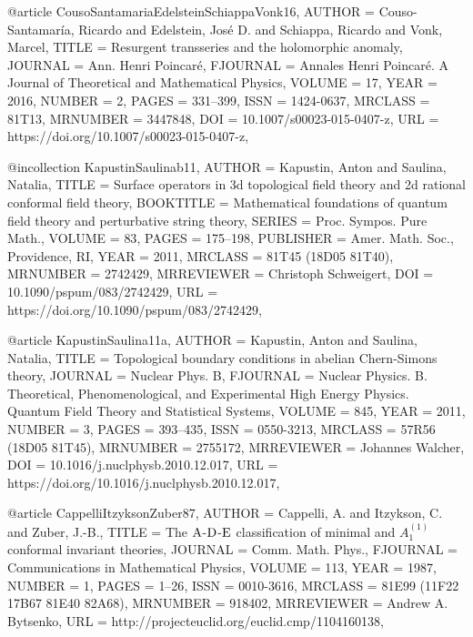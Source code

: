 @article {CousoSantamariaEdelsteinSchiappaVonk16,
    AUTHOR = {Couso-Santamar\'{i}a, Ricardo and Edelstein, Jos\'{e} D. and Schiappa,
              Ricardo and Vonk, Marcel},
     TITLE = {Resurgent transseries and the holomorphic anomaly},
   JOURNAL = {Ann. Henri Poincar\'{e}},
  FJOURNAL = {Annales Henri Poincar\'{e}. A Journal of Theoretical and
              Mathematical Physics},
    VOLUME = {17},
      YEAR = {2016},
    NUMBER = {2},
     PAGES = {331--399},
      ISSN = {1424-0637},
   MRCLASS = {81T13},
  MRNUMBER = {3447848},
       DOI = {10.1007/s00023-015-0407-z},
       URL = {https://doi.org/10.1007/s00023-015-0407-z},
}

@incollection {KapustinSaulinab11,
    AUTHOR = {Kapustin, Anton and Saulina, Natalia},
     TITLE = {Surface operators in 3d topological field theory and 2d
              rational conformal field theory},
 BOOKTITLE = {Mathematical foundations of quantum field theory and
              perturbative string theory},
    SERIES = {Proc. Sympos. Pure Math.},
    VOLUME = {83},
     PAGES = {175--198},
 PUBLISHER = {Amer. Math. Soc., Providence, RI},
      YEAR = {2011},
   MRCLASS = {81T45 (18D05 81T40)},
  MRNUMBER = {2742429},
MRREVIEWER = {Christoph Schweigert},
       DOI = {10.1090/pspum/083/2742429},
       URL = {https://doi.org/10.1090/pspum/083/2742429},
}

@article {KapustinSaulina11a,
    AUTHOR = {Kapustin, Anton and Saulina, Natalia},
     TITLE = {Topological boundary conditions in abelian {C}hern-{S}imons
              theory},
   JOURNAL = {Nuclear Phys. B},
  FJOURNAL = {Nuclear Physics. B. Theoretical, Phenomenological, and
              Experimental High Energy Physics. Quantum Field Theory and
              Statistical Systems},
    VOLUME = {845},
      YEAR = {2011},
    NUMBER = {3},
     PAGES = {393--435},
      ISSN = {0550-3213},
   MRCLASS = {57R56 (18D05 81T45)},
  MRNUMBER = {2755172},
MRREVIEWER = {Johannes Walcher},
       DOI = {10.1016/j.nuclphysb.2010.12.017},
       URL = {https://doi.org/10.1016/j.nuclphysb.2010.12.017},
}

@article {CappelliItzyksonZuber87,
    AUTHOR = {Cappelli, A. and Itzykson, C. and Zuber, J.-B.},
     TITLE = {The {${\rm A}$}-{${\rm D}$}-{${\rm E}$} classification of
              minimal and {$A^{(1)}_1$} conformal invariant theories},
   JOURNAL = {Comm. Math. Phys.},
  FJOURNAL = {Communications in Mathematical Physics},
    VOLUME = {113},
      YEAR = {1987},
    NUMBER = {1},
     PAGES = {1--26},
      ISSN = {0010-3616},
   MRCLASS = {81E99 (11F22 17B67 81E40 82A68)},
  MRNUMBER = {918402},
MRREVIEWER = {Andrew A. Bytsenko},
       URL = {http://projecteuclid.org/euclid.cmp/1104160138},
}

